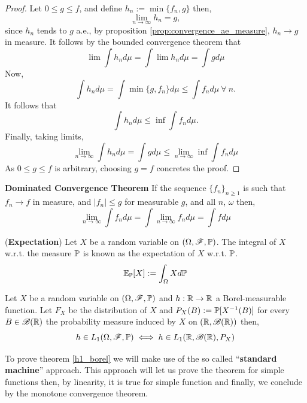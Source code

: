 \documentclass[../TGMAFFIRO.tex]{subfiles}
\begin{document}
\begin{proof}
	Let $0 \leq g \leq f$, and define $h_n:= \min\{f_n, g\}$ then,
	\[
		\lim_{n\to\infty} h_n = g,
	\]
	since $h_n$ tends to $g$ a.e., by proposition \ref{prop:convergence_ae_measure}, $h_n \to g$ in measure. It follows by the bounded convergence theorem that
	\begin{equation}
		\lim \int h_n d\mu = \int \lim h_n d\mu = \int g d\mu
	\end{equation}
	Now, 
	\[
		\int h_n d\mu = \int \min\{g, f_n\} d\mu \leq \int f_n d	\mu \ \forall \ n.
	\]
	It follows that
	\[
		\int h_n d\mu \leq \inf\int f_n d\mu.
	\]
	Finally, taking limits,
	\[
		\lim_{n\to\infty} \int h_n d\mu = \int g d\mu \leq \lim_{n\to\infty}\inf \int f_n d\mu
	\]
	As $0 \leq g \leq f$ is arbitrary, choosing $g = f$ concretes the proof.
\end{proof}

\begin{theorem} \textbf{Dominated Convergence Theorem}
If the sequence $\{f_n\}_{n\geq 1}$ is such that $f_n \to f$ in measure, and $|f_n| \leq g$ for measurable $g$, and all $n$, $\omega$ then,
\begin{equation}
	\lim_{n\to\infty}\int f_n d\mu = \int \lim_{n\to\infty} f_n d\mu  = \int f d\mu
\end{equation}
\end{theorem}


\begin{definition} (\textbf{Expectation})
	Let $X$ be a random variable on $(\Omega, \mathscr{F}, \mathbb{P})$. The integral of $X$ w.r.t. the measure $\mathbb{P}$ is known as the expectation of $X$ w.r.t. $\mathbb{P}$. 
	\begin{equation}
		\mathbb{E}_{\mathbb{P}}[X] := \int_\Omega X d\mathbb{P}
	\end{equation}
\end{definition}


\begin{theorem}\label{h1_borel}
		Let $X$ be a random variable on $(\Omega, \mathscr{F}, \mathbb{P})$ and $h: \mathbb{R} \to \mathbb{R}$ a Borel-measurable function. Let $F_X$ be the distribution of $X$ and $P_X(B):= \mathbb{P}[X^{-1}(B)]$ for every $B \in \mathscr{B}(\mathbb{R})$ the probability measure induced by $X$ on $(\mathbb{R}, \mathscr{B}(\mathbb{R}))$ then,
		\begin{equation}
			h \in L_1(\Omega, \mathscr{F}, \mathbb{P}) \iff h \in L_1(\mathbb{R}, \mathscr{B}(\mathbb{R}), P_X)
		\end{equation}
\end{theorem}

To prove theorem \ref{h1_borel} we will make use of the so called ``\textbf{standard machine}'' approach. This approach will let us prove the theorem for simple functions then, by linearity, it is true for simple function and finally, we conclude by the monotone convergence theorem.\\
\end{document}
